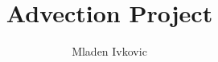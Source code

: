 




\title{Advection Project}


\author[M. Ivkovic]{Mladen Ivkovic}
\date{} 










% 
% 
% 
% 
% 







